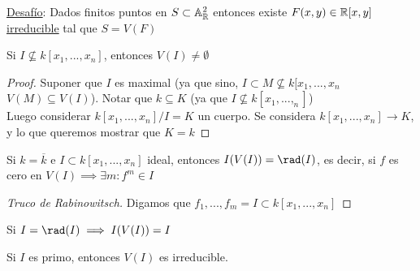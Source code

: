 \underline{Desafío}: Dados finitos puntos en $S\subset\mathbb{A}_{\mathbb{R}}^2$ entonces existe $F(x,y)\in \mathbb{R}[x,y]$ \underline{irreducible} tal que $S=V(F)$

\begin{thm}[Nullstenllensatz]
    Si $I\nsubseteq k[x_1,...,x_n]$, entonces $V(I)\neq\emptyset$
\end{thm}

\begin{proof}
    Suponer que $I$ es maximal (ya que sino, $I\subset M\nsubseteq k[x_1,...,x_n$ $V(M)\subseteq V(I)$). Notar que $k\subseteq K$ (ya que $I\nsubseteq k[x_1,...,_n]$)\\
    Luego considerar $k[x_1,...,x_n]/I=K$ un cuerpo. Se considera $k[x_1,...,x_n]\rightarrow K$, y lo que queremos mostrar que $K=k$ 
\end{proof}

\begin{thm}
    Si $k=\overline{k}$ e $I\subset k[x_1,...,x_n]$ ideal, entonces $I(V(I))=\rad(I)$, es decir, si $f$ es cero en $V(I)\implies \exists m: f^m\in I$
\end{thm}

\begin{proof}[Truco de Rabinowitsch]
    Digamos que $f_1,...,f_m=I\subset k[x_1,...,x_n]$
\end{proof}

\begin{cor}
    Si $I=\rad(I)\implies I(V(I))=I$
\end{cor}

\begin{cor}
    Si $I$ es primo, entonces $V(I)$ es irreducible.
\end{cor}

